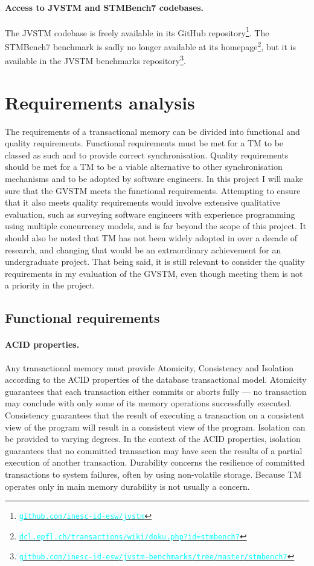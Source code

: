 \documentclass[12pt,a4paper,oneside,openright]{report}
\newcommand{\URL}[1]{\href{https://#1}{\textcolor{cyan}{\texttt{#1}}}}
\begin{document}
\paragraph{Access to JVSTM and STMBench7 codebases.} The JVSTM
codebase is freely available in its GitHub
repository\footnote{\URL{github.com/inesc-id-esw/jvstm}}. The
STMBench7 benchmark is sadly no longer available at its
homepage\footnote{\URL{dcl.epfl.ch/transactions/wiki/doku.php?id=stmbench7}},
but it is available in the JVSTM benchmarks
repository\footnote{\URL{github.com/inesc-id-esw/jvstm-benchmarks/tree/master/stmbench7}}.

\section{Requirements analysis}
\label{sec:requ-analys}

The requirements of a transactional memory can be divided into
functional and quality requirements. Functional requirements must be
met for a TM to be classed as such and to provide correct
synchronisation. Quality requirements should be met for a TM to be a
viable alternative to other synchronisation mechanisms and to be
adopted by software engineers. In this project I will make sure that
the GVSTM meets the functional requirements. Attempting to ensure that
it also meets quality requirements would involve extensive qualitative
evaluation, such as surveying software engineers with experience
programming using multiple concurrency models, and is far beyond the
scope of this project. It should also be noted that TM has not been
widely adopted in over a decade of research, and changing that would
be an extraordinary achievement for an undergraduate project. That
being said, it is still relevant to consider the quality requirements
in my evaluation of the GVSTM, even though meeting them is not a
priority in the project.

\subsection{Functional requirements}
\label{sec:prep:techn-requ}

\paragraph{ACID properties.} Any transactional memory must provide
Atomicity, Consistency and Isolation according to the ACID properties
of the database transactional model. Atomicity guarantees that each
transaction either commits or aborts fully --- no transaction may
conclude with only some of its memory operations successfully
executed. Consistency guarantees that the result of executing a
transaction on a consistent view of the program will result in a
consistent view of the program. Isolation can be provided to varying
degrees. In the context of the ACID properties, isolation guarantees
that no committed transaction may have seen the results of a partial
execution of another transaction. Durability concerns the resilience
of committed transactions to system failures, often by using
non-volatile storage. Because TM operates only in main memory
durability is not usually a concern.
\end{document}
